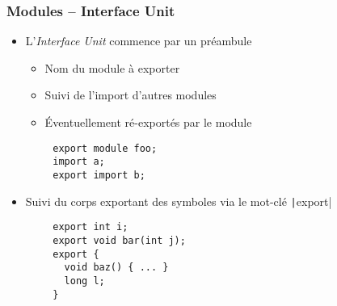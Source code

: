 \documentclass[C++.tex]{subfiles}
\begin{document}
\begin{frame}[fragile]
	\frametitle{Modules -- Interface Unit}
	\begin{itemize}
		\item L'\textit{Interface Unit} commence par un préambule
		\begin{itemize}
			\item Nom du module à exporter
			\item Suivi de l'import d'autres modules
			\item Éventuellement ré-exportés par le module
		\end{itemize}
	\end{itemize}

	\begin{verbatim}
		export module foo;
		import a;
		export import b;
	\end{verbatim}

	\begin{itemize}
		\item Suivi du corps exportant des symboles via le mot-clé \texttt|export|
	\end{itemize}


	\begin{verbatim}
		export int i;
		export void bar(int j);
		export {
		  void baz() { ... }
		  long l;
		}
	\end{verbatim}
\end{frame}
\end{document}

